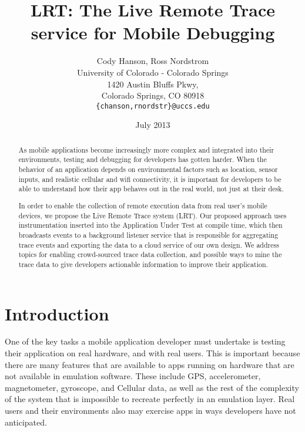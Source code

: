 \documentclass{acm_proc_article-sp}
\begin{document}
\title{LRT: The Live Remote Trace service for Mobile Debugging}
\author{Cody Hanson, Ross Nordstrom\\
        University of Colorado - Colorado Springs\\
        1420 Austin Bluffs Pkwy,\\
        Colorado Springs, CO 80918

        \texttt{\{chanson,rnordstr\}@uccs.edu}
       }
\date{July 2013}

\maketitle

\begin{abstract}
    As mobile applications become increasingly  more complex and integrated into their
    environments, testing and debugging for developers has gotten harder.
    When the behavior of an application depends on environmental factors 
    such as location, sensor inputs, and realistic cellular and wifi connectivity,
    it is important for developers to be able to understand how their app
    behaves out in the real world, not just at their desk.

    In order to enable the collection of remote execution data from real user's
    mobile devices, we propose the Live Remote Trace system (LRT). Our proposed
    approach uses instrumentation inserted into the Application Under Test at compile time,
    which then broadcasts events to a background listener service that is responsible for
    aggregating trace events and exporting the data to a cloud service of our
    own design. We address topics for enabling crowd-sourced trace data collection,
    and possible ways to mine the trace data to give developers actionable 
    information to improve their application.
\end{abstract}


\section{Introduction}
One of the key tasks a mobile application developer must undertake is testing 
their application on real hardware, and with real users. This is important 
because there are many features that are available to apps running on hardware 
that are not available in emulation software. These include GPS, accelerometer, 
magnetometer, gyroscope, and Cellular data, as well as the rest of the 
complexity of the system that is impossible to recreate perfectly in an 
emulation layer. Real users and their environments also may exercise apps in
ways developers have not anticipated. 
\end{document}

